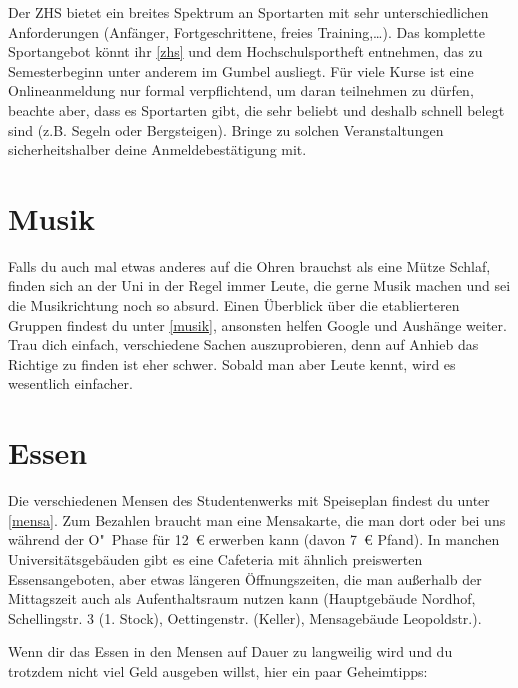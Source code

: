 Der ZHS bietet ein breites Spektrum an Sportarten mit sehr unterschiedlichen
Anforderungen (Anfänger, Fortgeschrittene, freies Training,\ldots). Das
komplette Sportangebot könnt ihr \ref{zhs} und dem Hochschulsportheft
entnehmen, das zu Semesterbeginn unter anderem im Gumbel ausliegt. Für viele
Kurse ist eine Onlineanmeldung nur formal verpflichtend, um daran teilnehmen zu
dürfen, beachte aber, dass es Sportarten gibt, die sehr beliebt und deshalb
schnell belegt sind (z.B. Segeln oder Bergsteigen). Bringe zu solchen
Veranstaltungen sicherheitshalber deine Anmeldebestätigung mit.

\begin{urlList}
\end{urlList}

\section{Musik}
Falls du auch mal etwas anderes auf die Ohren brauchst als eine
Mütze Schlaf, finden sich an der Uni in der Regel immer Leute, die gerne Musik
machen und sei die Musikrichtung noch so absurd. Einen Überblick über die
etablierteren Gruppen findest du unter \ref{musik}, ansonsten helfen Google und
Aushänge weiter. Trau dich einfach, verschiedene Sachen auszuprobieren, denn
auf Anhieb das Richtige zu finden ist eher schwer. Sobald man aber Leute kennt,
wird es wesentlich einfacher.

\begin{urlList}
\end{urlList}


\section{Essen}
Die verschiedenen Mensen des Studentenwerks mit Speiseplan findest du unter \ref{mensa}. Zum Bezahlen braucht man eine Mensakarte, die man dort oder bei uns während der O"~Phase für 12~€ erwerben kann (davon 7~€ Pfand). In manchen Universitätsgebäuden gibt es eine Cafeteria mit ähnlich preiswerten Essensangeboten, aber etwas längeren Öffnungszeiten, die man außerhalb der Mittagszeit auch als Aufenthaltsraum nutzen kann (Hauptgebäude Nordhof, Schellingstr. 3 (1. Stock), Oettingenstr. (Keller), Mensagebäude Leopoldstr.).

Wenn dir das Essen in den Mensen auf Dauer zu langweilig wird und du trotzdem nicht viel Geld ausgeben willst, hier ein paar Geheimtipps:

